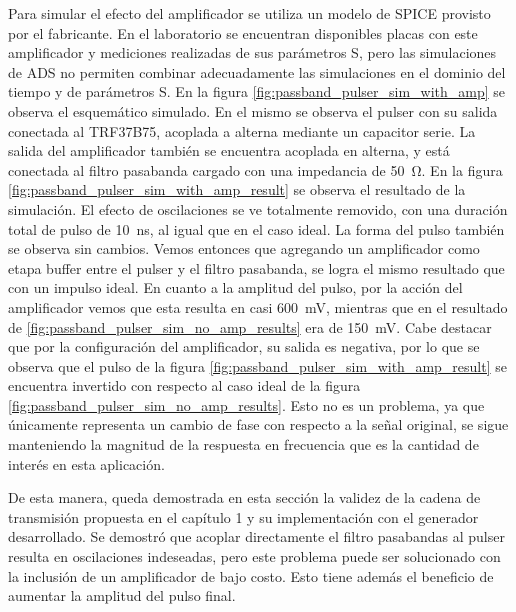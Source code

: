 Para simular el efecto del amplificador se utiliza un modelo de SPICE provisto
por el fabricante. En el laboratorio se encuentran disponibles placas con este
amplificador y mediciones realizadas de sus parámetros S, pero las simulaciones
de ADS no permiten combinar adecuadamente las simulaciones en el dominio del
tiempo y de parámetros S. En la figura \ref{fig:passband_pulser_sim_with_amp} se
observa el esquemático simulado. En el mismo se observa el pulser con su salida
conectada al TRF37B75, acoplada a alterna mediante un capacitor serie. La salida
del amplificador también se encuentra acoplada en alterna, y está conectada al
filtro pasabanda cargado con una impedancia de \qty{50}{\ohm}. En la figura
\ref{fig:passband_pulser_sim_with_amp_result} se observa el resultado de la
simulación. El efecto de oscilaciones se ve totalmente removido, con una
duración total de pulso de \qty{10}{\nano\second}, al igual que en el caso
ideal. La forma del pulso también se observa sin cambios. Vemos entonces que
agregando un amplificador como etapa buffer entre el pulser y el filtro
pasabanda, se logra el mismo resultado que con un impulso ideal. En cuanto a la
amplitud del pulso, por la acción del amplificador vemos que esta resulta en
casi \qty{600}{\milli\volt}, mientras que en el resultado de
\ref{fig:passband_pulser_sim_no_amp_results} era de \qty{150}{\milli\volt}. Cabe
destacar que por la configuración del amplificador, su salida es negativa, por
lo que se observa que el pulso de la figura
\ref{fig:passband_pulser_sim_with_amp_result} se encuentra invertido con
respecto al caso ideal de la figura
\ref{fig:passband_pulser_sim_no_amp_results}. Esto no es un problema, ya que
únicamente representa un cambio de fase con respecto a la señal original, se
sigue manteniendo la magnitud de la respuesta en frecuencia que es la cantidad
de interés en esta aplicación.

De esta manera, queda demostrada en esta sección la validez de la cadena de transmisión
propuesta en el capítulo 1 y su implementación con el generador desarrollado. Se
demostró que acoplar directamente el filtro pasabandas al pulser resulta en
oscilaciones indeseadas, pero este problema puede ser solucionado con la
inclusión de un amplificador de bajo costo. Esto tiene además el beneficio de
aumentar la amplitud del pulso final.

